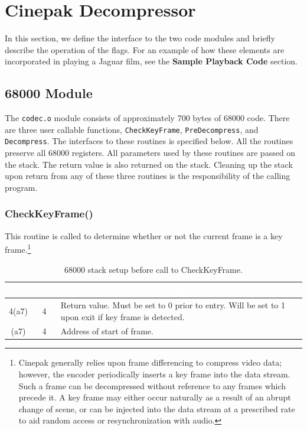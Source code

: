 \documentclass[12pt,letterpaper,twoside]{article}
\newcommand{\tabheadtxt}[1]{\multicolumn{1}{c}{\textcolor{white}{\textbf{#1}}}}
\begin{document}
\section{Cinepak Decompressor}
In this section, we define the interface to the two code modules and briefly describe the operation of the flags. For an example of how these elements are incorporated in playing a Jaguar film, see the \textbf{Sample Playback Code} section.

\subsection{68000 Module}
The \texttt{codec.o} module consists of approximately 700 bytes of 68000 code. There are three user callable functions, \texttt{CheckKeyFrame}, \texttt{PreDecompress}, and \texttt{Decompress}. The interfaces to these routines is specified below. All the routines preserve all 68000 registers. All parameters used by these routines are passed on the stack. The return value is also returned on the stack. Cleaning up the stack upon return from any of these three routines is the responsibility of the calling program.

\subsubsection{CheckKeyFrame()}
This routine is called to determine whether or not the current frame is a key frame.\footnote{Cinepak generally relies upon frame differencing to compress video data; however, the encoder periodically inserts a key frame into the data stream. Such a frame can be decompressed without reference to any frames which precede it. A key frame may either occur naturally as a result of an abrupt change of scene, or can be injected into the data stream at a prescribed rate to aid random access or resynchronization with audio.}

\begin{table}[h]
\centering
\begin{tabular}{|c|c|p{8cm}|}
\hline
\rowcolor{black}
\tabheadtxt{Stack Offset} & \tabheadtxt{Size} & \tabheadtxt{Description} \\
\hline
4(a7) & 4 & Return value. Must be set to 0 prior to entry. Will be set to 1 upon exit if key frame is detected. \\
\hline
(a7) & 4 & Address of start of frame. \\
\hline
\end{tabular}
\caption{68000 stack setup before call to CheckKeyFrame.}
\label{tab:checkKeyFrame}
\end{table}
\FloatBarrier
\end{document}
